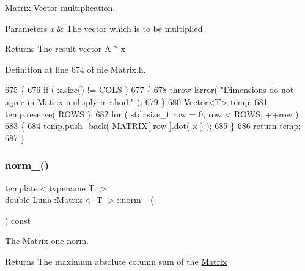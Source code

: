 \hyperlink{classLuna_1_1Matrix}{Matrix} \hyperlink{classLuna_1_1Vector}{Vector} multiplication. 


\begin{DoxyParams}{Parameters}
{\em x} & The vector which is to be multiplied \\
\hline
\end{DoxyParams}
\begin{DoxyReturn}{Returns}
The result vector A $\ast$ x 
\end{DoxyReturn}


Definition at line 674 of file Matrix.\+h.


\begin{DoxyCode}
675   \{
676     \textcolor{keywordflow}{if} ( \hyperlink{namespaceHeat__plot_aa88370c16b85b784ccbde3ed88bc1991}{x}.size() != COLS )
677     \{
678       \textcolor{keywordflow}{throw} Error( \textcolor{stringliteral}{"Dimensions do not agree in Matrix multiply method."} );
679     \}
680     Vector<T> temp;
681     temp.reserve( ROWS );
682     \textcolor{keywordflow}{for} ( std::size\_t row = 0; row < ROWS; ++row )
683     \{
684       temp.push\_back( MATRIX[ row ].dot( \hyperlink{namespaceHeat__plot_aa88370c16b85b784ccbde3ed88bc1991}{x} ) );
685     \}
686     \textcolor{keywordflow}{return} temp;
687   \}
\end{DoxyCode}
\mbox{\label{classLuna_1_1Matrix_a7a687e4f0eab389331d2ba90f41acdba}} 
\subsubsection{\texorpdfstring{norm\+\_()}{norm\_1()}}
{\footnotesize\ttfamily template$<$typename T $>$ \\
double \hyperlink{classLuna_1_1Matrix}{Luna\+::\+Matrix}$<$ T $>$\+::norm\+\_ (\begin{DoxyParamCaption}{ }\end{DoxyParamCaption}) const\hspace{0.3cm}{\ttfamily [inline]}}



The \hyperlink{classLuna_1_1Matrix}{Matrix} one-\/norm. 

\begin{DoxyReturn}{Returns}
The maximum absolute column sum of the \hyperlink{classLuna_1_1Matrix}{Matrix} 
\end{DoxyReturn}


